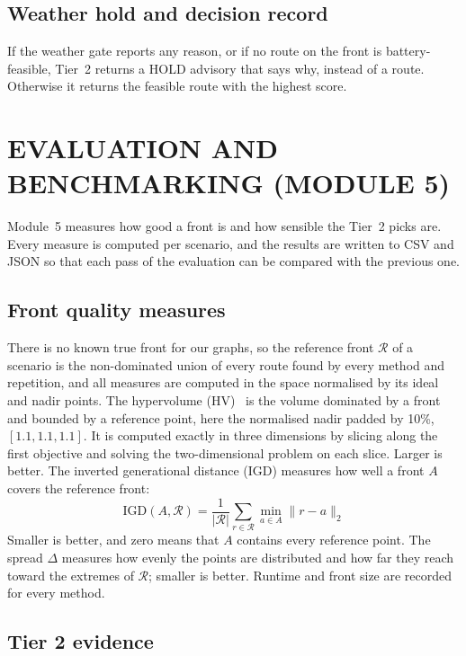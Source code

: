 \subsection{Weather hold and decision record}

If the weather gate reports any reason, or if no route on the front is battery-feasible,
Tier~2 returns a HOLD advisory that says why, instead of a route. Otherwise it returns
the feasible route with the highest score.

\section{EVALUATION AND BENCHMARKING (MODULE 5)}\label{sec:m5}

Module~5 measures how good a front is and how sensible the Tier~2 picks are. Every
measure is computed per scenario, and the results are written to CSV and JSON so that
each pass of the evaluation can be compared with the previous one.

\subsection{Front quality measures}

There is no known true front for our graphs, so the reference front $\mathcal{R}$ of a
scenario is the non-dominated union of every route found by every method and
repetition, and all measures are computed in the space normalised by its ideal and
nadir points. The hypervolume (HV)~\cite{r18} is the volume dominated by a front and bounded by a
reference point, here the normalised nadir padded by 10\%, $[1.1, 1.1, 1.1]$. It is
computed exactly in three dimensions by slicing along the first objective and solving
the two-dimensional problem on each slice. Larger is better. The inverted generational
distance (IGD) measures how well a front $A$ covers the reference front:
\begin{equation}
  \mathrm{IGD}(A, \mathcal{R}) = \frac{1}{\lvert\mathcal{R}\rvert}\sum_{r \in \mathcal{R}} \min_{a \in A} \lVert r - a \rVert_2
\end{equation}
Smaller is better, and zero means that $A$ contains every reference point. The spread
$\Delta$ measures how evenly the points are distributed and how far they reach toward
the extremes of $\mathcal{R}$; smaller is better. Runtime and front size are recorded
for every method.

\subsection{Tier 2 evidence}

